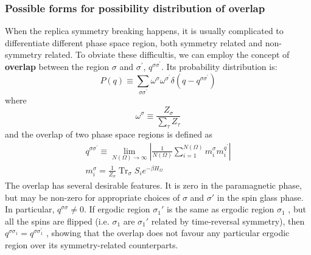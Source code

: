 \documentclass[12pt,titlepage]{article}
\numberwithin{equation}{section}
\begin{document}
\subsubsection{Possible forms for possibility distribution of overlap}
When the replica symmetry breaking happens, it is usually complicated to differentiate different phase space region, both symmetry related and non-symmetry related. To obviate these difficultis, we can employ the concept of \textbf{overlap} between the region $\sigma$ and $\sigma^{\prime}$, $q^{\sigma\sigma^{\prime}}$. Its probability distribution is:
\begin{equation}
    P(q)\equiv\sum_{\sigma\sigma^{\prime}}\omega^{\sigma}\omega^{\sigma^{\prime}}\delta(q-q^{\sigma\sigma^{\prime}})
\end{equation}
where
\begin{equation}
    \omega^{\sigma}\equiv\frac{Z_{\sigma}}{\sum_{\tau}Z_{\tau}}
\end{equation}
and the overlap of two phase space regions is defined as
\begin{equation}
    \begin{array}{c}{q^{\sigma \sigma^{\prime}} \equiv \lim _{N(\Omega) \rightarrow \infty}\left|\frac{1}{N(\Omega)} \sum_{i=1}^{N(\Omega)} m_{i}^{\sigma} m_{i}^{q^{\prime}}\right|} \\ {m_{i}^{\sigma}=\frac{1}{Z_{\sigma}} \operatorname{Tr}_{\sigma} S_{i} e^{-\beta H_{\Omega}}}\end{array}
\end{equation}
The overlap has several desirable features. It is zero in the paramagnetic phase, but may be non-zero for appropriate choices of $\sigma$ and $\sigma'$ in the spin glass phase. In particular, $q^{\sigma \sigma} \neq 0$. If ergodic region $\sigma_1'$ is the same as ergodic region $\sigma_1$ , but all the spins are flipped (i.e. $\sigma_1$ are $\sigma_1'$ related by time-reversal symmetry), then $q^{\sigma \sigma_{1}}=q^{\sigma \sigma_{1}^{\prime}}$ , showing that the overlap does not favour any particular ergodic region over its symmetry-related counterparts.
\end{document}
